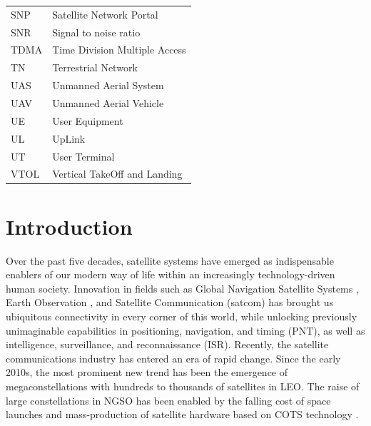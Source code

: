\documentclass[english, 12pt, a4paper, elec, utf8, a-1b, online]{aaltothesis}
\begin{document}
\begin{tabular}{ll}
SNP                     & Satellite Network Portal \\
SNR                     & Signal to noise ratio \\
TDMA                    & Time Division Multiple Access \\
TN                      & Terrestrial Network \\
UAS                     & Unmanned Aerial System \\
UAV                     & Unmanned Aerial Vehicle \\
UE                      & User Equipment \\
UL                      & UpLink \\
UT                      & User Terminal \\
VTOL                    & Vertical TakeOff and Landing
\end{tabular}

\cleardoublepage

\section{Introduction}


Over the past five decades, satellite systems have emerged as indispensable enablers of our modern way of life within an increasingly technology-driven human society.
Innovation in fields such as Global Navigation Satellite Systems \cite{oconnor2019economic}, Earth Observation \cite{lupi2022socioeconomic, tassa2020socioeconomic}, and Satellite Communication (satcom) \cite{euroconsult-space-economy-2023} has brought us ubiquitous connectivity in every corner of this world, while unlocking previously unimaginable capabilities in positioning, navigation, and timing (PNT), as well as intelligence, surveillance, and reconnaissance (ISR).
Recently, the satellite communications industry has entered an era of rapid change.
Since the early 2010s, the most prominent new trend has been the emergence of megaconstellations with hundreds to thousands of satellites in LEO.
The raise of large constellations in NGSO has been enabled by the falling cost of space launches and mass-production of satellite hardware based on COTS technology \cite{euroconsult-space-economy-2023}.
\end{document}
